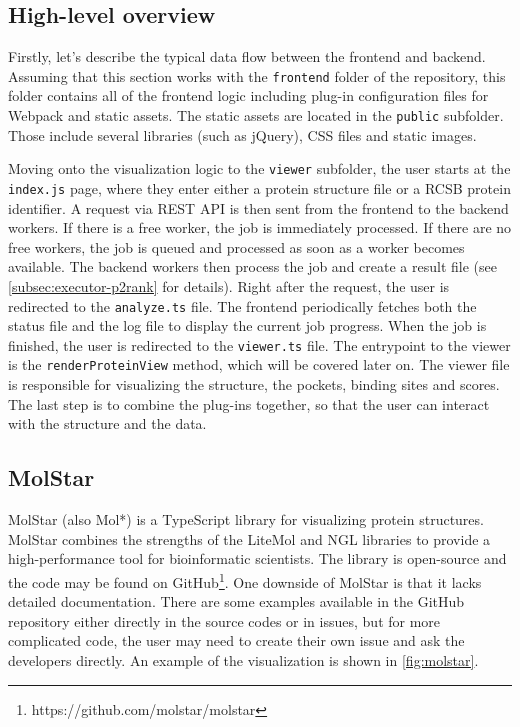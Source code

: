 \subsection{High-level overview}
\label{subsec:frontend-overview}

Firstly, let's describe the typical data flow between the frontend and backend. Assuming that this section works with the \texttt{frontend} folder of the repository, this folder contains all of the frontend logic including plug-in configuration files for Webpack and static assets. The static assets are located in the \texttt{public} subfolder. Those include several libraries (such as jQuery), CSS files and static images.

Moving onto the visualization logic to the \texttt{viewer} subfolder, the user starts at the \texttt{index.js} page, where they enter either a protein structure file or a RCSB protein identifier. A request via REST API is then sent from the frontend to the backend workers. If there is a free worker, the job is immediately processed. If there are no free workers, the job is queued and processed as soon as a worker becomes available. The backend workers then process the job and create a result file (see \cref{subsec:executor-p2rank} for details). Right after the request, the user is redirected to the \texttt{analyze.ts} file. The frontend periodically fetches both the status file and the log file to display the current job progress. When the job is finished, the user is redirected to the \texttt{viewer.ts} file. The entrypoint to the viewer is the \texttt{renderProteinView} method, which will be covered later on. The viewer file is responsible for visualizing the structure, the pockets, binding sites and scores. The last step is to combine the plug-ins together, so that the user can interact with the structure and the data.

\subsection{MolStar}
\label{subsec:frontend-molstar}

MolStar (also Mol*) is a TypeScript library for visualizing protein structures. MolStar combines the strengths of the LiteMol and NGL libraries to provide a high-performance tool for bioinformatic scientists. The library is open-source and the code may be found on GitHub\footnote{https://github.com/molstar/molstar}. One downside of MolStar is that it lacks detailed documentation. There are some examples available in the GitHub repository either directly in the source codes or in issues, but for more complicated code, the user may need to create their own issue and ask the developers directly. An example of the visualization is shown in \cref{fig:molstar}.

